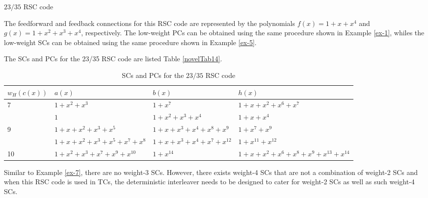 \begin{example}{$23/35$ RSC code}

The feedforward and feedback connections for this RSC code are represented by the polynomials  $f(x)=1+x+x^4$ and  $g(x)=1+x^2+x^3+x^4$, respectively. The low-weight PCs can be obtained using the same procedure shown in Example \ref{ex-1}, whiles the low-weight SCs can be obtained using the same procedure shown in Example \ref{ex-5}. 

The SCs and PCs  for the 23/35 RSC code are listed Table \ref{novelTab14}.
\begin{table}[htbp]
	\caption{SCs and PCs for the $23/35$ RSC code}
	\centering
	\begin{tabularx}{0.75\textwidth}{lXlX} 
		\hline
		$w_H(c(x))$ & $a(x)$ & $b(x)$ & $h(x)$ \\ [0.5ex] 
		\hline\hline
		7&$1+x^2+x^3$ & $1+x^7$ & $1+x+x^2+x^6+x^7$\\
		\hline
		&$1$ & $1+x^2+x^3+x^4$ & $1+x+x^{4}$\\
		\hline \hline
		9&$1+x+x^2+x^3+x^5$ & $1+x+x^3+x^4+x^8+x^9$ & $1+x^7+x^9$\\
		\hline
		&$1+x+x^2+x^3+x^5+x^7+x^8$ & $1+x+x^3+x^4+x^7+x^{12}$ & $1+x^{11}+x^{12}$\\
		\hline\hline
		10&$1+x^2+x^3+x^7+x^9+x^{10}$ & $1+x^{14}$ & $1+x+x^2+x^6+x^8+x^9+x^{13}+x^{14}$\\
		\hline
	\end{tabularx}
	
	\label{novelTab15}
\end{table}

Similar to Example \ref{ex-7}, there are no weight-3 SCs. However, there exists weight-4 SCs that are not a combination of weight-2 SCs and when this RSC code is used in TCs, the deterministic interleaver needs to be designed to cater for weight-2 SCs as well as such weight-4 SCs. 
 

\end{example}
